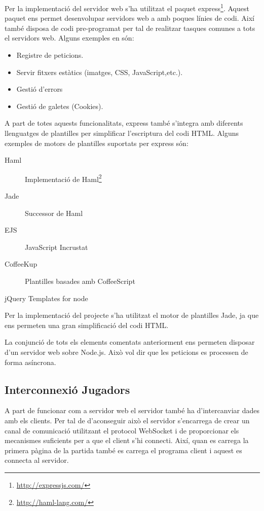 Per la implementació del servidor web s'ha utilitzat el paquet express\footnote{\url{http://expressjs.com/}}. Aquest paquet ens permet desenvolupar servidors web a amb poques línies de codi. Així també disposa de codi pre-programat per tal de realitzar tasques comunes a tots el servidors web. Alguns exemples en són:

\begin{itemize}
\item{Registre de peticions.}
\item{Servir fitxers estàtics (imatges, CSS, JavaScript,etc.).}
\item{Gestió d'errors}
\item{Gestió de galetes (Cookies).}
\end{itemize}

A part de totes aquests funcionalitats, express també s'integra amb diferents llenguatges de plantilles per simplificar l'escriptura del codi HTML. Alguns exemples de motors de plantilles suportats per express són: 

\begin{description}
\item[Haml] {Implementació de Haml\footnote{\url{http://haml-lang.com/}} }
\item[Jade] {Successor de Haml}
\item[EJS] {JavaScript Incrustat}
\item[CoffeeKup] {Plantilles basades amb CoffeeScript}
\item[jQuery Templates for node]
\end{description}

Per la implementació del projecte s'ha utilitzat el motor de plantilles Jade, ja que ens permeten una gran simplificació del codi HTML.

La conjunció de tots els elements comentats anteriorment ens permeten disposar d'un servidor web sobre Node.js. Això vol dir que les peticions es processen de forma asíncrona. 

\subsection{Interconnexió Jugadors}
\label{sec:interconnexio-jugadors}
A part de funcionar com a servidor web el servidor també ha d'intercanviar dades amb els clients. Per tal de d'aconseguir això el servidor s'encarrega de crear un canal de comunicació utilitzant el protocol WebSocket i de proporcionar els mecanismes suficients per a que el client s'hi connecti. Així, quan es carrega la primera pàgina de la partida també es carrega el programa client i aquest es connecta al servidor. 

